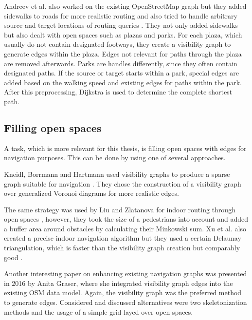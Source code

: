 		Andreev et al. also worked on the existing OpenStreetMap graph but they added sidewalks to roads for more realistic routing and also tried to handle arbitrary source and target locations of routing queries \cite{andreev-osm-generate-sidewalks}.
		They not only added sidewalks but also dealt with open spaces such as plazas and parks.
		For each plaza, which usually do not contain designated footways, they create a visibility graph to generate edges within the plaza.
		Edges not relevant for paths through the plaza are removed afterwards.
		Parks are handles differently, since they often contain designated paths.
		If the source or target starts within a park, special edges are added based on the walking speed and existing edges for paths within the park.
		After this preprocessing, Dijkstra is used to determine the complete shortest path.
	
	\subsection{Filling open spaces}
	\label{subsec:filling-open-spaces}
	
		A task, which is more relevant for this thesis, is filling open spaces with edges for navigation purposes.
		This can be done by using one of several approaches.
	
		Kneidl, Borrmann and Hartmann used visibility graphs to produce a sparse graph suitable for navigation \cite{kneidl-borrmann-hartmann-navigation}.
		They chose the construction of a visibility graph over generalized Voronoi diagrams for more realistic edges.
		
		The same strategy was used by Liu and Zlatanova for indoor routing through open spaces \cite{liu-indoor-routing}, however, they took the size of a pedestrians into account and added a buffer area around obstacles by calculating their Minkowski sum.
		Xu et al. also created a precise indoor navigation algorithm but they used a certain Delaunay triangulation, which is faster than the visibility graph creation but comparably good \cite{xu-indoor-delaunay}.
		
		Another interesting paper on enhancing existing navigation graphs was presented in 2016 by Anita Graser, where she integrated visibility graph edges into the existing OSM data model\cite{graser-osm-open-spaces}.
		Again, the visibility graph was the preferred method to generate edges.
		Considered and discussed alternatives were two skeletonization methods and the usage of a simple grid layed over open spaces.
		
